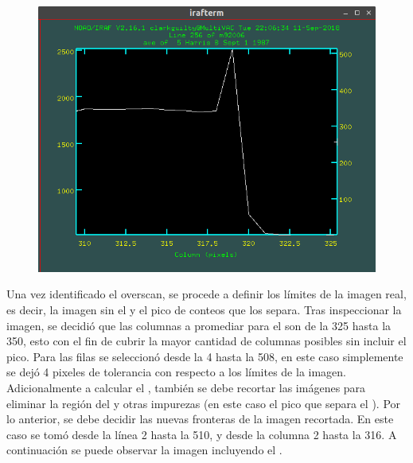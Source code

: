 \documentclass[12pt]{article}
\begin{document}
\begin{figure}[H]
  \centering
   \includegraphics[scale= 0.5]{im01.png}
  \label{im01}
\end{figure}



Una vez identificado el overscan, se procede a definir los límites de la imagen real, es decir, la imagen sin el   y el pico de conteos que los separa. Tras inspeccionar la imagen, se decidió que las columnas a promediar para el  son de la 325 hasta la 350, esto con el fin de cubrir la mayor cantidad de columnas posibles sin incluir el pico. Para las filas se seleccionó desde la 4 hasta la 508, en este caso simplemente se dejó 4 pixeles de tolerancia con respecto a los límites de la imagen.\\

Adicionalmente a calcular el , también se debe recortar las imágenes para eliminar la región del   y otras impurezas (en este caso el pico que separa el ). Por lo anterior, se debe decidir las nuevas fronteras de la imagen recortada. En este caso se tomó desde la línea 2 hasta la 510, y desde la columna 2 hasta la 316. A continuación se puede observar la imagen incluyendo el  .
\end{document}
